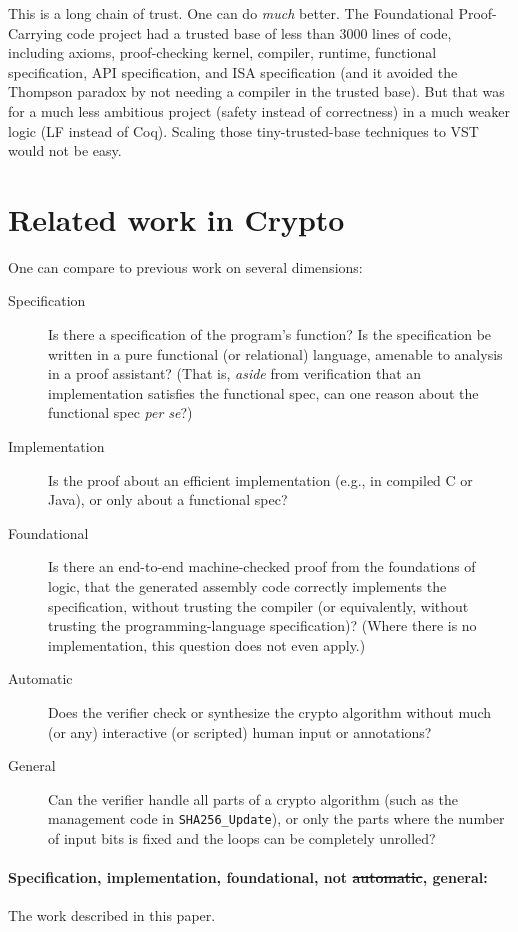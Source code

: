 \documentclass[prodmode,acmtoplas]{acmsmall}
\begin{document}
This is a long chain of trust.  One can do \emph{much}
better.  The Foundational Proof-Carrying code project
had a trusted base of less than 3000 lines of code,
including axioms, proof-checking kernel, compiler, runtime,
functional specification, API specification, and ISA
specification \cite{wu03:flit}
(and it avoided the Thompson paradox by not needing a compiler
in the trusted base).
But that was for a much less ambitious project (safety
instead of correctness) in a much weaker logic (LF
instead of Coq).  Scaling those tiny-trusted-base techniques
to VST would not be easy.

\section{Related work in Crypto}

One can compare to previous work on several dimensions:
\begin{description}
\item[Specification]  Is there a specification
of the program's function?
Is the specification be written in a
pure functional (or relational) language, amenable to analysis in a proof assistant?
(That is, \emph{aside} from verification that an implementation satisfies
the functional spec, can one reason about the functional spec \emph{per se}?)
\item[Implementation]  Is the proof about an efficient implementation
(e.g., in compiled C or Java), or only about a functional spec?
\item[Foundational]  Is there an end-to-end machine-checked proof 
from the foundations of logic, that the 
generated assembly code correctly implements the specification,
without trusting the compiler (or equivalently, without trusting
the programming-language specification)?  (Where there is no 
implementation, this question does not even apply.)
\item[Automatic]  Does the verifier check or synthesize the crypto algorithm
without much (or any) interactive (or scripted) human input or annotations?
\item[General] Can the verifier handle all parts of a crypto algorithm
(such as the management code in \lstinline{SHA256_Update}), or only
the parts where the number of input bits is fixed
and the loops can be completely unrolled?
\end{description}

\paragraph{Specification, implementation, foundational, not \st{automatic}, general:}
The work described in this paper.
\end{document}
